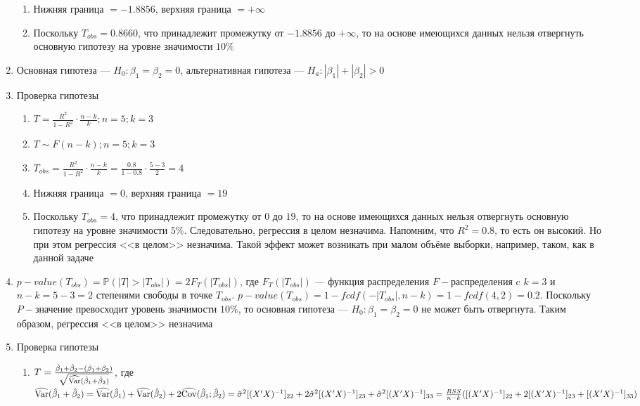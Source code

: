 \documentclass[pdftex,11pt,openany]{book}\usepackage[]{graphicx}\usepackage[]{color}
\begin{document}
\begin{solution}
\begin{enumerate}
\begin{enumerate}
\item Нижняя граница $= -1.8856$, верхняя граница $= +\infty$
\item Поскольку $T_{obs} = 0.8660$, что принадлежит промежутку от $-1.8856$ до $+\infty$, то на основе имеющихся данных нельзя отвергнуть основную гипотезу на уровне значимости $10\%$
\end{enumerate}
\item Основная гипотеза --- $H_0: \beta_1 = \beta_2 = 0$, альтернативная гипотеза --- $H_a: |\beta_1| + |\beta_2| > 0$
\item Проверка гипотезы
\begin{enumerate}
\item $T = \frac{R^2}{1 - R^2} \cdot \frac{n-k}{k}; n = 5; k = 3$
\item $T \sim F(n-k); n = 5; k = 3$
\item $T_{obs} = \frac{R^2}{1 - R^2} \cdot \frac{n-k}{k} = \frac{0.8}{1 - 0.8} \cdot \frac{5-3}{2} = 4$
\item Нижняя граница $= 0$, верхняя граница $= 19$
\item Поскольку $T_{obs} = 4$, что принадлежит промежутку от $0$ до $19$, то на основе имеющихся данных нельзя отвергнуть основную гипотезу на уровне значимости $5\%$. Следовательно, регрессия в целом незначима. Напомним, что $R^2 = 0.8$, то есть он высокий. Но при этом регрессия <<в целом>> незначима. Такой эффект может возникать при малом объёме выборки, например, таком, как в данной задаче
\end{enumerate}
\item $p-value(T_{obs}) = \mathbb{P}(|T|>|T_{obs}|) = 2F_{T}(|T_{obs}|)$, где $F_{T}(|T_{obs}|)$ --- функция распределения $F-$распределения c $k = 3$ и $n - k = 5 - 3 = 2$ степенями свободы в точке $T_{obs}$. $p-value(T_{obs}) = 1 - fcdf(-|T_{obs}|, n - k) = 1 - fcdf(4,2) = 0.2$. Поскольку $P-$значение превосходит уровень значимости $10\%$, то основная гипотеза --- $H_0: \beta_1 = \beta_2 = 0$ не может быть отвергнута. Таким образом, регрессия <<в целом>> незначима
\item Проверка гипотезы
\begin{enumerate}
\item $T = \frac{\hat{\beta}_1 + \hat{\beta}_2 - (\beta_1 + \beta_2)}{\sqrt{\widehat{\operatorname{Var}}(\hat{\beta}_1 + \hat{\beta}_2)}}$, где $\widehat{\operatorname{Var}}(\hat{\beta}_1 + \hat{\beta}_2) = \widehat{\operatorname{Var}}(\hat{\beta}_1) + \widehat{\operatorname{Var}}(\hat{\beta}_2) + 2\widehat{\operatorname{Cov}}(\hat{\beta}_1;\hat{\beta}_2) = \hat{\sigma}^2 [(X'X)^{-1}]_{22} + 2\hat{\sigma}^2 [(X'X)^{-1}]_{23} + \hat{\sigma}^2 [(X'X)^{-1}]_{33}= \frac{RSS}{n - k}([(X'X)^{-1}]_{22} + 2[(X'X)^{-1}]_{23} + [(X'X)^{-1}]_{33})$

\end{enumerate}
\end{enumerate}
\end{solution}
\end{document}
